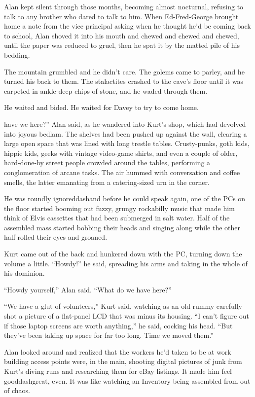 Alan kept silent through those months, becoming almost nocturnal,
refusing to talk to any brother who dared to talk to him.  When
Ed-Fred-George brought home a note from the vice principal asking when
he thought he'd be coming back to school, Alan shoved it into his
mouth and chewed and chewed and chewed, until the paper was reduced to
gruel, then he spat it by the matted pile of his bedding.

The mountain grumbled and he didn't care.  The golems came to parley,
and he turned his back to them.  The stalactites crashed to the cave's
floor until it was carpeted in ankle-deep chips of stone, and he waded
through them.

He waited and bided.  He waited for Davey to try to come home.

have we here?'' Alan said, as he wandered into Kurt's shop,
which had devolved into joyous bedlam.  The shelves had been pushed up
against the wall, clearing a large open space that was lined with long
trestle tables.  Crusty-punks, goth kids, hippie kids, geeks with
vintage video-game shirts, and even a couple of older, hard-done-by
street people crowded around the tables, performing a conglomeration
of arcane tasks.  The air hummed with conversation and coffee smells,
the latter emanating from a catering-sized urn in the corner.

He was roundly ignoreddash{}and before he could speak again, one of the
PCs on the floor started booming out fuzzy, grungy rockabilly music
that made him think of Elvis cassettes that had been submerged in salt
water.  Half of the assembled mass started bobbing their heads and
singing along while the other half rolled their eyes and groaned.

Kurt came out of the back and hunkered down with the PC, turning down
the volume a little.  ``Howdy!'' he said, spreading his arms and
taking in the whole of his dominion.

``Howdy yourself,'' Alan said.  ``What do we have here?''

``We have a glut of volunteers,'' Kurt said, watching as an old rummy
carefully shot a picture of a flat-panel LCD that was minus its
housing.  ``I can't figure out if those laptop screens are worth
anything,'' he said, cocking his head.  ``But they've been taking up
space for far too long.  Time we moved them.''

Alan looked around and realized that the workers he'd taken to be at
work building access points were, in the main, shooting digital
pictures of junk from Kurt's diving runs and researching them for eBay
listings.  It made him feel gooddash{}great, even.  It was like watching
an Inventory being assembled from out of chaos.

